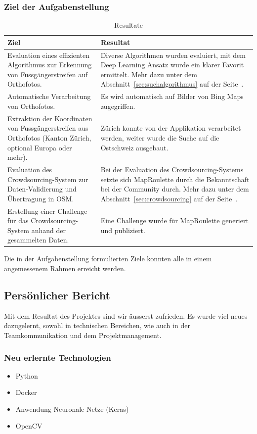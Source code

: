 \subsubsection{Ziel der Aufgabenstellung}
\begin{table}[H]
    \begin{tabular}{|p{6cm}|p{8cm}|}
    \hline    
    \rowcolor{lightblue}
	Ziel & Resultat \\ \hline
	Evaluation eines effizienten Algorithmus zur Erkennung von Fussgängerstreifen auf Orthofotos. & Diverse Algorithmen wurden evaluiert, mit dem Deep Learning Ansatz wurde ein klarer Favorit ermittelt. Mehr dazu unter dem Abschnitt~\ref{sec:suchalgorithmus} auf der Seite~\pageref{sec:suchalgorithmus}.\\ \hline
	Automatische Verarbeitung von Orthofotos. & Es wird automatisch auf Bilder von Bing Maps zugegriffen.\\ \hline
	Extraktion der Koordinaten von Fussgängerstreifen aus Orthofotos (Kanton Zürich, optional Europa oder mehr). & Zürich konnte von der Applikation verarbeitet werden, weiter wurde die Suche auf die Ostschweiz ausgebaut. \\ \hline
	Evaluation des Crowdsourcing-System zur Daten-Validierung und Übertragung in OSM.& Bei der Evaluation des Crowdsourcing-Systems setzte sich MapRoulette durch die Bekanntschaft bei der Community durch. Mehr dazu unter dem Abschnitt~\ref{sec:crowdsourcing} auf der Seite~\pageref{sec:crowdsourcing}. \\ \hline
	Erstellung einer Challenge für das Crowdsourcing-System anhand der gesammelten Daten. & Eine Challenge wurde für MapRoulette generiert und publiziert.\\ \hline
    \end{tabular}
    \caption[Resultate]{Resultate}
\end{table}
Die in der Aufgabenstellung formulierten Ziele konnten alle in einem angemessenem Rahmen erreicht werden. 

\subsection{Persönlicher Bericht}
Mit dem Resultat des Projektes sind wir äusserst zufrieden. Es wurde viel neues dazugelernt, sowohl in technischen Bereichen, wie auch in der Teamkommunikation und dem Projektmanagement.
\subsubsection{Neu erlernte Technologien}
\begin{itemize}
	\item Python
	\item Docker
	\item Anwendung Neuronale Netze (Keras)
	\item OpenCV
\end{itemize}

